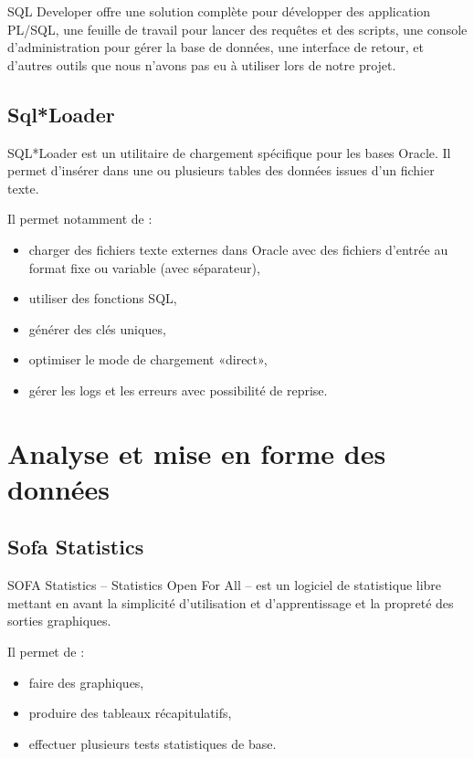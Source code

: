 		SQL Developer offre une solution complète pour développer des application PL/SQL, une feuille de travail pour lancer des requêtes et des scripts, une console d\rq{}administration pour gérer la base de données, une interface de retour, et d\rq{}autres outils que nous n\rq{}avons pas eu à utiliser lors de notre projet.
	
	
	\subsection{Sql*Loader}
		SQL*Loader est un utilitaire de chargement spécifique pour les bases Oracle. Il permet d'insérer dans une ou plusieurs tables des données issues d'un fichier texte.

		Il permet notamment de :
		\begin{itemize}
			\item charger des fichiers texte externes dans Oracle avec des fichiers d'entrée au format fixe ou variable (avec séparateur),
			\item utiliser des fonctions SQL,
			\item générer des clés uniques,
			\item optimiser le mode de chargement «direct»,
			\item gérer les logs et les erreurs avec possibilité de reprise.
		\end{itemize}



\section{Analyse et mise en forme des données}
	
	\subsection{Sofa Statistics}
		SOFA Statistics -- Statistics Open For All -- est un logiciel de statistique libre mettant en avant la simplicité d'utilisation et d'apprentissage et la propreté des sorties graphiques.

		Il permet de :
		\begin{itemize}
			\item faire des graphiques,
			\item produire des tableaux récapitulatifs,
			\item effectuer plusieurs tests statistiques de base.
		\end{itemize}
		
